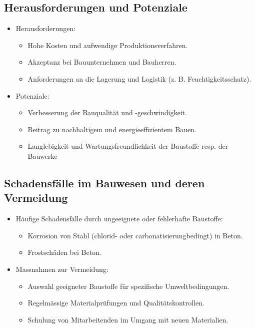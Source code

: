 \documentclass[
11pt,
captions=tableheading,
smallheadings,
headsepline,
footsepline, 
captions=tableheading,
parskip=half-,
]{scrartcl}
\begin{document}
\subsection{Herausforderungen und Potenziale}
\begin{itemize}
    \item Herausforderungen:
          \begin{itemize}
              \item Hohe Kosten und aufwendige Produktionsverfahren.
              \item Akzeptanz bei Bauunternehmen und Bauherren.
              \item Anforderungen an die Lagerung und Logistik (z. B. Feuchtigkeitsschutz).
          \end{itemize}
    \item Potenziale:
          \begin{itemize}
              \item Verbesserung der Bauqualität und -geschwindigkeit.
              \item Beitrag zu nachhaltigem und energieeffizientem Bauen.
              \item Langlebigkeit und Wartungsfreundlichkeit der Baustoffe resp. der Bauwerke
          \end{itemize}
\end{itemize}

\subsection{Schadensfälle im Bauwesen und deren Vermeidung}
\begin{itemize}
    \item Häufige Schadensfälle durch ungeeignete oder fehlerhafte Baustoffe:
          \begin{itemize}
              \item Korrosion von Stahl  (chlorid- oder carbonatisierungbedingt) in Beton.
              \item Frostschäden bei Beton.
          \end{itemize}
    \item Massnahmen zur Vermeidung:
          \begin{itemize}
              \item Auswahl geeigneter Baustoffe für spezifische Umweltbedingungen.
              \item Regelmässige Materialprüfungen und Qualitätskontrollen.
              \item Schulung von Mitarbeitenden im Umgang mit neuen Materialien.
          \end{itemize}
\end{itemize}
\end{document}
